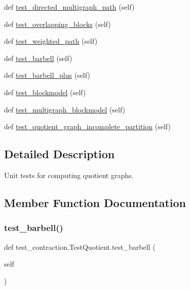 \begin{DoxyCompactItemize}
\item 
def \hyperlink{classtest__contraction_1_1TestQuotient_a6f51d082dad002b399b902f8badbebe5}{test\+\_\+directed\+\_\+multigraph\+\_\+path} (self)
\item 
def \hyperlink{classtest__contraction_1_1TestQuotient_abc639461460cf7c8ea6767ab5a1ed440}{test\+\_\+overlapping\+\_\+blocks} (self)
\item 
def \hyperlink{classtest__contraction_1_1TestQuotient_a1dd9f7f409cd275fb3116b633a393ede}{test\+\_\+weighted\+\_\+path} (self)
\item 
def \hyperlink{classtest__contraction_1_1TestQuotient_a1443eb84888c96807f60aba7bf739f15}{test\+\_\+barbell} (self)
\item 
def \hyperlink{classtest__contraction_1_1TestQuotient_aeaee7de1669254243ba90ee58394044b}{test\+\_\+barbell\+\_\+plus} (self)
\item 
def \hyperlink{classtest__contraction_1_1TestQuotient_add819b844c6ba0c6ad7e77f96ca48728}{test\+\_\+blockmodel} (self)
\item 
def \hyperlink{classtest__contraction_1_1TestQuotient_a18fb1b12d2afe5987d9a536825b5e1db}{test\+\_\+multigraph\+\_\+blockmodel} (self)
\item 
def \hyperlink{classtest__contraction_1_1TestQuotient_ab8450e0b77df9a76db3d59c8569d90ee}{test\+\_\+quotient\+\_\+graph\+\_\+incomplete\+\_\+partition} (self)
\end{DoxyCompactItemize}


\subsection{Detailed Description}
\begin{DoxyVerb}Unit tests for computing quotient graphs.\end{DoxyVerb}
 

\subsection{Member Function Documentation}
\mbox{\label{classtest__contraction_1_1TestQuotient_a1443eb84888c96807f60aba7bf739f15}} 
\subsubsection{\texorpdfstring{test\+\_\+barbell()}{test\_barbell()}}
{\footnotesize\ttfamily def test\+\_\+contraction.\+Test\+Quotient.\+test\+\_\+barbell (\begin{DoxyParamCaption}\item[{}]{self }\end{DoxyParamCaption})}

